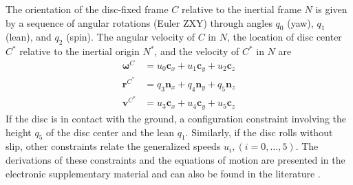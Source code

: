 \documentclass[smallcondensed]{svjour3}                     %
\begin{document}
The orientation of the disc-fixed frame $C$ relative to the inertial frame $N$
is given by a sequence of angular rotations (Euler ZXY) through angles $q_0$
(yaw), $q_1$ (lean), and $q_2$ (spin).  The angular velocity of $C$ in $N$, the
location of disc center $C^*$ relative to the inertial origin $N^*$, and the
velocity of $C^*$ in $N$ are
\begin{align}
  \bm{\omega}^C &= u_0 \bm{c}_x + u_1 \bm{c}_y + u_2 \bm{c}_z \\
  \bm{r}^{C^*} &= q_3 \bm{n}_x + q_4 \bm{n}_y + q_5 \bm{n}_z \\
  \bm{v}^{C^*} &= u_3 \bm{c}_x + u_4 \bm{c}_y + u_5 \bm{c}_z
\end{align}
If the disc is in contact with the ground, a configuration constraint involving
the height $q_5$ of the disc center and the lean $q_1$.  Similarly, if the disc
rolls without slip, other constraints relate the generalized speeds $u_i, (i =
0,\dots,5)$.  The derivations of these constraints and the equations of motion
are presented in the electronic supplementary material and can also be found in
the literature \cite{O'Reilly1996}.
\end{document}
